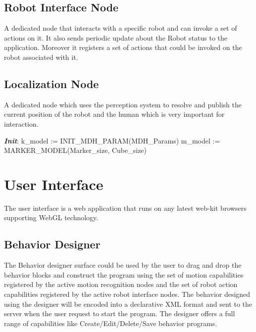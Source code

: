 \subsection{Robot Interface Node} A dedicated node that interacts with a specific robot and can invoke a set of actions on it. It also sends periodic update about the Robot status to the application. Moreover it registers a set of actions that could be invoked on the robot associated with it.
\subsection{Localization Node} A dedicated node which uses the perception system to resolve and publish the current position of the robot and the human which is very important for interaction.

\begin{algorithm}
 \textbf{\emph{Init}}:\;
 k\_model := INIT\_MDH\_PARAM(MDH\_Params)\;
 m\_model := MARKER\_MODEL(Marker\_size, Cube\_size)\;
\end{algorithm}


\section{User Interface}
\label{ssec:ui_comp}
The user interface is a web application that runs on any latest web-kit browsers supporting WebGL technology. 

\subsection{Behavior Designer} The Behavior designer surface could be used by the user to drag and drop the behavior blocks and construct the program using the set of motion capabilities registered by the active motion recognition nodes and the set of robot action capabilities registered by the active robot interface nodes. The behavior designed using the designer will be encoded into a declarative XML format and sent to the server when the user request to start the program. The designer offers a full range of capabilities like Create/Edit/Delete/Save behavior programs.
